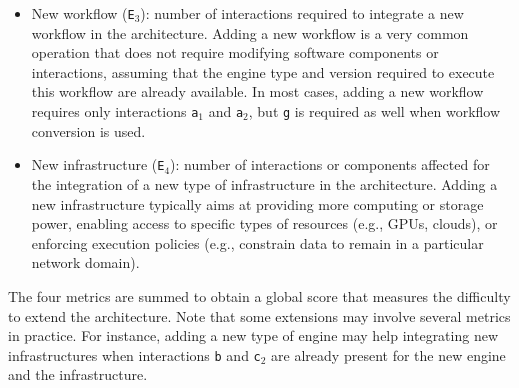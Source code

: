 \documentclass[preprint,3p,twocolumn]{elsarticle}
\newcommand{\todo}[2]{\pdfmargincomment[color=red,author=#1,open=true]{#2}}
\newcommand{\note}[2]{\pdfmargincomment[color=yellow,author=#1,open=true]{#2}}
\newcommand{\closednote}[4]{} %
\begin{document}
\begin{itemize}[leftmargin=0cm,itemindent=0.35cm,itemsep=0cm]
{    diagrams.. is that correct? if it can, give an example of how this
    is seen in the diagram}{Tristan}{Done}
\item New workflow (\texttt{E$_3$}): number of interactions required
  to integrate a new workflow in the architecture. Adding a new
  workflow is a very common operation that does not require modifying
  software components or interactions, assuming that the engine type
  and version required to execute this workflow are already
  available. In most cases, adding a new workflow requires only
  interactions \texttt{a$_1$} and \texttt{a$_2$}, but \texttt{g}
  is required as well when workflow conversion is used. \closednote{sil}{again
    here it would be good to indicate how this is seen in the diagram}{Tristan}{done}
\item New infrastructure (\texttt{E$_4$}): number of interactions or
  components affected for the integration of a new type of infrastructure in
  the architecture. Adding a new infrastructure typically aims at providing more
  computing or storage power, enabling access to specific types of resources
  (e.g., GPUs, clouds), or  enforcing execution policies (e.g.,
  constrain data to remain in a particular network domain).
\end{itemize}
The four metrics are summed to obtain a global score that measures the
difficulty to extend the architecture. \closednote{Naj}{I would rather compare each metric separately, this woudl also give a sense of how different architectures compare across metrics}{Tristan}{Metrics are compared separately too, see Table 2 and discussion.} Note that some extensions may
involve several metrics in practice. For instance, adding a new type
of engine may help integrating new infrastructures when interactions
\texttt{b} and \texttt{c$_2$} are already present for the new engine
and the infrastructure.  \closednote{Rafael}{Adding a new engine type may
  also allow run in different infrastructures. Maybe it is worth to
  put a sentence to clarify that the metric account for it
  separately.}{Tristan}{It will not *allow* because interaction c1
  would still need to be developed. But it will definitely facilitate
  it. I added a note on this after the description of the metrics.}
\end{document}
